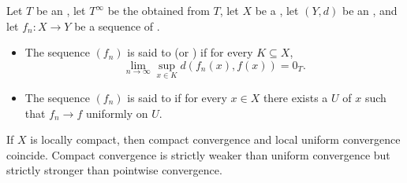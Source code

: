\begin{definition} \label{definition:local_and_compact_uniform_convergence_of_sequences_of_functions_from_a_topological_space_to_an_extended_metric_space_valued_in_ordered_commutative_monoid_with_adjoined_infinity}
    Let $T$ be an , let $T^\infty$ be the  obtained from $T$, let $X$ be a , let $(Y, d)$ be an , and let $f_n : X \to Y$ be a sequence of .

    \begin{itemize}
        \item The sequence $(f_n)$ is said to  (or ) if for every  $K \subseteq X$,
        $$\lim_{n \to \infty} \sup_{x \in K} d(f_n(x), f(x)) = 0_T.$$

        \item The sequence $(f_n)$ is said to  if for every $x \in X$ there exists a  $U$ of $x$ such that $f_n \to f$ uniformly on $U$.
    \end{itemize}

    If $X$ is locally compact, then compact convergence and local uniform convergence coincide. Compact convergence is strictly weaker than uniform convergence but strictly stronger than pointwise convergence.
\end{definition}